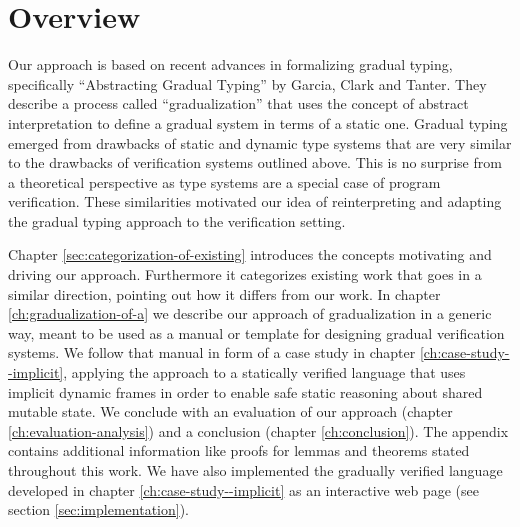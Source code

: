 
\section{Overview}
Our approach is based on recent advances in formalizing gradual typing, specifically “Abstracting Gradual Typing” \cite{garcia2016abstracting} by Garcia, Clark and Tanter.
They describe a process called “gradualization” that uses the concept of abstract interpretation to define a gradual system in terms of a static one.
Gradual typing emerged from drawbacks of static and dynamic type systems that are very similar to the drawbacks of verification systems outlined above.
This is no surprise from a theoretical perspective as type systems are a special case of program verification. 
These similarities motivated our idea of reinterpreting and adapting the gradual typing approach to the verification setting.

Chapter \ref{sec:categorization-of-existing} introduces the concepts motivating and driving our approach.
Furthermore it categorizes existing work that goes in a similar direction, pointing out how it differs from our work.
In chapter \ref{ch:gradualization-of-a} we describe our approach of gradualization in a generic way, meant to be used as a manual or template for designing gradual verification systems.
We follow that manual in form of a case study in chapter \ref{ch:case-study--implicit}, applying the approach to a statically verified language that uses implicit dynamic frames in order to enable safe static reasoning about shared mutable state.
We conclude with an evaluation of our approach (chapter \ref{ch:evaluation-analysis}) and a conclusion (chapter \ref{ch:conclusion}).
The appendix contains additional information like proofs for lemmas and theorems stated throughout this work. %
We have also implemented the gradually verified language developed in chapter \ref{ch:case-study--implicit} as an interactive web page (see section \ref{sec:implementation}).
